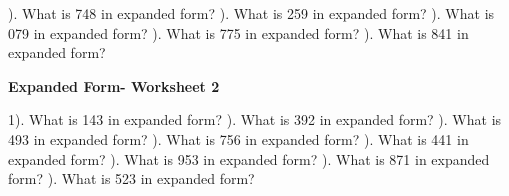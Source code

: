\documentclass{article}%
\begin{document}
). What is 748 in expanded form?%
\newline%
\newline%
). What is 259 in expanded form?%
\newline%
\newline%
). What is 079 in expanded form?%
\newline%
\newline%
). What is 775 in expanded form?%
\newline%
\newline%
). What is 841 in expanded form?%
\newline%
\newline%
\newline%
\pagebreak%
\large%
\begin{center}%
\textbf{Expanded Form- Worksheet 2}%
\newline%
\end{center} \normalsize%
1). What is 143 in expanded form?%
\newline%
\newline%
). What is 392 in expanded form?%
\newline%
\newline%
). What is 493 in expanded form?%
\newline%
\newline%
). What is 756 in expanded form?%
\newline%
\newline%
). What is 441 in expanded form?%
\newline%
\newline%
). What is 953 in expanded form?%
\newline%
\newline%
). What is 871 in expanded form?%
\newline%
\newline%
). What is 523 in expanded form?%
\newline%
\newline%
\end{document}
